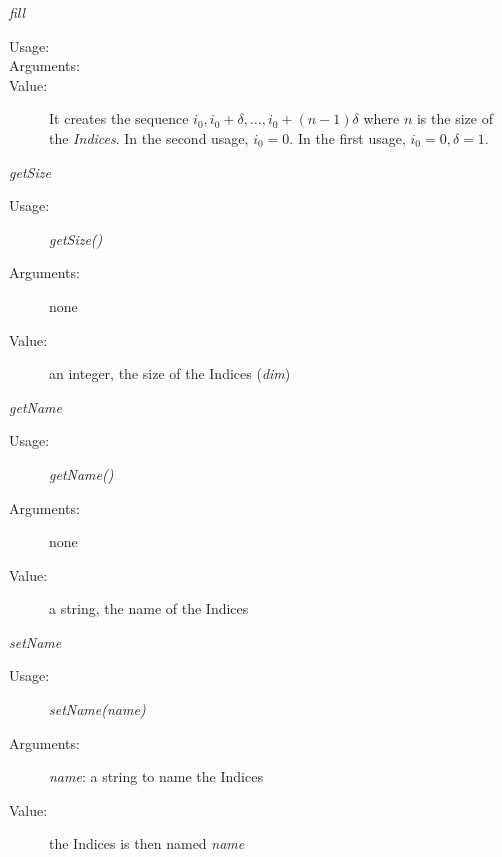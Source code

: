 \begin{description}
\begin{description}
\item \textit{fill}
\begin{description}
\item[Usage:] \rule{0pt}{1em}
\item[Arguments:]
\item[Value:] It creates the sequence $i_0, i_0+\delta, \hdots, i_0+(n-1)\delta$ where $n$ is the size of the \textit{Indices}. In the second usage, $i_0=0$. In the first usage, $i_0=0, \delta = 1$.
\end{description}
\bigskip

\item \textit{getSize}
\begin{description}
\item[Usage:] \textit{getSize()}
\item[Arguments:] none
\item[Value:] an integer, the size of the Indices (\textit{dim})
\end{description}
\bigskip


\item \textit{getName}
\begin{description}
\item[Usage:] \textit{getName()}
\item[Arguments:] none
\item[Value:] a string, the name of the Indices
\end{description}
\bigskip

\item \textit{setName}
\begin{description}
\item[Usage:] \textit{setName(name)}
\item[Arguments:] \textit{name}: a string to name the Indices
\item[Value:] the Indices is then named \textit{name}
\end{description}
\bigskip

\end{description}
\end{description}


\newpage
{}
